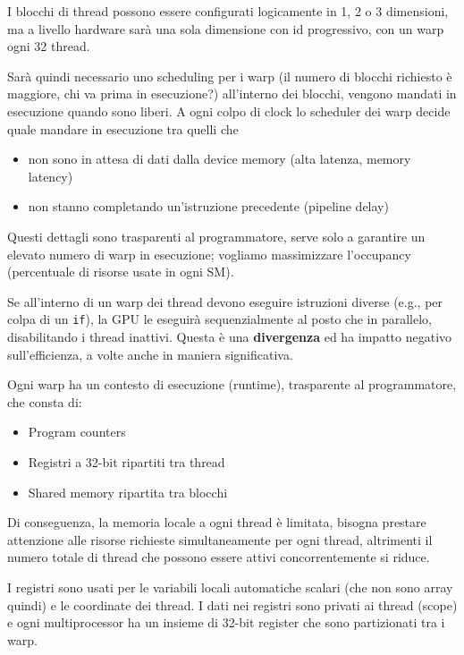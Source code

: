 I blocchi di thread possono essere configurati logicamente in 1, 2 o 3 dimensioni, ma a livello hardware sarà una sola dimensione con id progressivo, con un warp ogni 32 thread.

Sarà quindi necessario uno scheduling per i warp (il numero di blocchi richiesto è maggiore, chi va prima in esecuzione?) all'interno dei blocchi, vengono mandati in esecuzione quando sono liberi. A ogni colpo di clock lo scheduler dei warp decide quale mandare in esecuzione tra quelli che
\begin{itemize}
	\item non sono in attesa di dati dalla device memory (alta latenza, memory latency)
	
	\item non stanno completando un'istruzione precedente (pipeline delay)
\end{itemize}

Questi dettagli sono trasparenti al programmatore, serve solo a garantire un elevato numero di warp in esecuzione; vogliamo massimizzare l'occupancy (percentuale di risorse usate in ogni SM).

Se all'interno di un warp dei thread devono eseguire istruzioni diverse (e.g., per colpa di un \texttt{if}), la GPU le eseguirà sequenzialmente al posto che in parallelo, disabilitando i thread inattivi. Questa è una \textbf{divergenza} ed ha impatto negativo sull'efficienza, a volte anche in maniera significativa. 

Ogni warp ha un contesto di esecuzione (runtime), trasparente al programmatore, che consta di: 
\begin{itemize}
	\item Program counters
	
	\item Registri a 32-bit ripartiti tra thread
	
	\item Shared memory ripartita tra blocchi
\end{itemize} 

Di conseguenza, la memoria locale a ogni thread è limitata, bisogna prestare attenzione alle risorse richieste simultaneamente per ogni thread, altrimenti il numero totale di thread che possono essere attivi concorrentemente si riduce.

I registri sono usati per le variabili locali automatiche scalari (che non sono array quindi) e le coordinate dei thread. I dati nei registri sono privati ai thread (scope) e ogni multiprocessor ha un insieme di 32-bit register che sono partizionati tra i warp.

